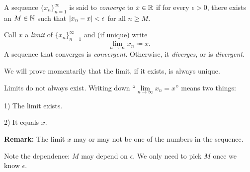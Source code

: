 \documentclass[10pt,aspectratio=149]{beamer}
\begin{document}
\begin{frame}
\begin{definition}
A sequence $\{ x_n \}_{n=1}^\infty$ is said to \emph{converge} to
$x \in {\mathbb{R}}$ if for every $\epsilon > 0$, there exists an $M \in {\mathbb{N}}$ such
that $\left\lvert {x_n - x} \right\rvert < \epsilon$ for all $n \geq M$.
\pause

Call $x$ a \emph{limit} of $\{ x_n \}_{n=1}^\infty$ and (if unique) write
\begin{equation*}
\lim_{n\to \infty} x_n \coloneqq x .
\end{equation*}
\pause
A sequence
that converges is \emph{convergent}.
Otherwise, it \emph{diverges}, or is \emph{divergent}.
\end{definition}

\pause

We will prove momentarily that the limit,
if it exists, is always unique.

\pause
\medskip

Limits do not always exist.
\pause
Writing down ``$\lim\limits_{n\to\infty} x_n = x$'' means two things:

1) The limit exists.

2) It equals $x$.

\pause
\medskip

\textbf{Remark:}
The limit $x$ may or may not be one of the numbers in the sequence.

\pause
\medskip

Note the dependence: $M$ may depend on $\epsilon$.  We only need to pick $M$
once we know $\epsilon$.
\end{frame}

\begin{frame}
\centering
{}

\medskip

\end{frame}
\end{document}

